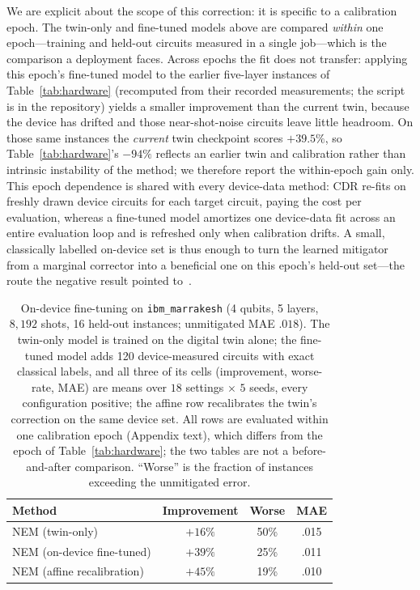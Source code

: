 \documentclass[11pt]{article}
\begin{document}
We are explicit about the scope of this correction: it is specific to a calibration epoch. The twin-only and fine-tuned models above are compared \emph{within} one epoch---training and held-out circuits measured in a single job---which is the comparison a deployment faces. Across epochs the fit does not transfer: applying this epoch's fine-tuned model to the earlier five-layer instances of Table~\ref{tab:hardware} (recomputed from their recorded measurements; the script is in the repository) yields a smaller improvement than the current twin, because the device has drifted and those near-shot-noise circuits leave little headroom. On those same instances the \emph{current} twin checkpoint scores $+39.5\%$, so Table~\ref{tab:hardware}'s $-94\%$ reflects an earlier twin and calibration rather than intrinsic instability of the method; we therefore report the within-epoch gain only. This epoch dependence is shared with every device-data method: CDR re-fits on freshly drawn device circuits for each target circuit, paying the cost per evaluation, whereas a fine-tuned model amortizes one device-data fit across an entire evaluation loop and is refreshed only when calibration drifts. A small, classically labelled on-device set is thus enough to turn the learned mitigator from a marginal corrector into a beneficial one on this epoch's held-out set---the route the negative result pointed to~\citep{liao2025noiseagnostic,adeniyi2025adaptive}.

\begin{table}[t]
\caption{On-device fine-tuning on \texttt{ibm\_marrakesh} (4 qubits, 5 layers, $8{,}192$ shots, 16 held-out instances; unmitigated MAE $.018$). The twin-only model is trained on the digital twin alone; the fine-tuned model adds 120 device-measured circuits with exact classical labels, and all three of its cells (improvement, worse-rate, MAE) are means over $18$ settings $\times$ $5$ seeds, every configuration positive; the affine row recalibrates the twin's correction on the same device set. All rows are evaluated within one calibration epoch (Appendix text), which differs from the epoch of Table~\ref{tab:hardware}; the two tables are not a before-and-after comparison. ``Worse'' is the fraction of instances exceeding the unmitigated error.}
\label{tab:hardware_ft}
\centering
\small
\begin{tabular}{lccc}
\toprule
Method & Improvement & Worse & MAE \\
\midrule
NEM (twin-only) & $+16\%$ & 50\% & .015 \\
NEM (on-device fine-tuned) & $+39\%$ & 25\% & .011 \\
NEM (affine recalibration) & $+45\%$ & 19\% & .010 \\
\bottomrule
\end{tabular}
\end{table}
\end{document}
